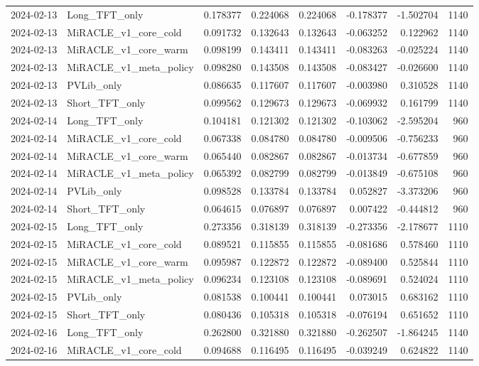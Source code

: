 \begin{tabular}{llrrrrrr}
2024-02-13 & Long_TFT_only & 0.178377 & 0.224068 & 0.224068 & -0.178377 & -1.502704 & 1140 \\
2024-02-13 & MiRACLE_v1_core_cold & 0.091732 & 0.132643 & 0.132643 & -0.063252 & 0.122962 & 1140 \\
2024-02-13 & MiRACLE_v1_core_warm & 0.098199 & 0.143411 & 0.143411 & -0.083263 & -0.025224 & 1140 \\
2024-02-13 & MiRACLE_v1_meta_policy & 0.098280 & 0.143508 & 0.143508 & -0.083427 & -0.026600 & 1140 \\
2024-02-13 & PVLib_only & 0.086635 & 0.117607 & 0.117607 & -0.003980 & 0.310528 & 1140 \\
2024-02-13 & Short_TFT_only & 0.099562 & 0.129673 & 0.129673 & -0.069932 & 0.161799 & 1140 \\
2024-02-14 & Long_TFT_only & 0.104181 & 0.121302 & 0.121302 & -0.103062 & -2.595204 & 960 \\
2024-02-14 & MiRACLE_v1_core_cold & 0.067338 & 0.084780 & 0.084780 & -0.009506 & -0.756233 & 960 \\
2024-02-14 & MiRACLE_v1_core_warm & 0.065440 & 0.082867 & 0.082867 & -0.013734 & -0.677859 & 960 \\
2024-02-14 & MiRACLE_v1_meta_policy & 0.065392 & 0.082799 & 0.082799 & -0.013849 & -0.675108 & 960 \\
2024-02-14 & PVLib_only & 0.098528 & 0.133784 & 0.133784 & 0.052827 & -3.373206 & 960 \\
2024-02-14 & Short_TFT_only & 0.064615 & 0.076897 & 0.076897 & 0.007422 & -0.444812 & 960 \\
2024-02-15 & Long_TFT_only & 0.273356 & 0.318139 & 0.318139 & -0.273356 & -2.178677 & 1110 \\
2024-02-15 & MiRACLE_v1_core_cold & 0.089521 & 0.115855 & 0.115855 & -0.081686 & 0.578460 & 1110 \\
2024-02-15 & MiRACLE_v1_core_warm & 0.095987 & 0.122872 & 0.122872 & -0.089400 & 0.525844 & 1110 \\
2024-02-15 & MiRACLE_v1_meta_policy & 0.096234 & 0.123108 & 0.123108 & -0.089691 & 0.524024 & 1110 \\
2024-02-15 & PVLib_only & 0.081538 & 0.100441 & 0.100441 & 0.073015 & 0.683162 & 1110 \\
2024-02-15 & Short_TFT_only & 0.080436 & 0.105318 & 0.105318 & -0.076194 & 0.651652 & 1110 \\
2024-02-16 & Long_TFT_only & 0.262800 & 0.321880 & 0.321880 & -0.262507 & -1.864245 & 1140 \\
2024-02-16 & MiRACLE_v1_core_cold & 0.094688 & 0.116495 & 0.116495 & -0.039249 & 0.624822 & 1140 \\

\end{tabular}
